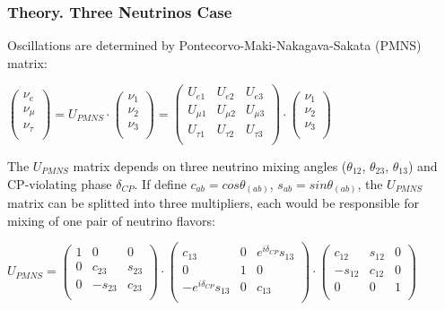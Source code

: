 \begin{frame}\frametitle{Theory. Three Neutrinos Case}
  \scriptsize
  Oscillations are determined by Pontecorvo-Maki-Nakagava-Sakata (PMNS) matrix:\\
  \begin{center}
  $ \begin{pmatrix} \nu_{e} \\ \nu_{\mu} \\ \nu_{\tau} \\ \end{pmatrix}
  = U_{PMNS}\cdot \begin{pmatrix} \nu_{1} \\ \nu_{2} \\ \nu_{3} \\ \end{pmatrix} = 
  \begin{pmatrix}
  U_{e1} & U_{e2} & U_{e3} \\
  U_{\mu1} & U_{\mu2} & U_{\mu3} \\
  U_{\tau1} & U_{\tau2} & U_{\tau3} \\
  \end{pmatrix}
  \cdot
  \begin{pmatrix} \nu_{1} \\ \nu_{2} \\ \nu_{3} \\ \end{pmatrix}$\\
  \end{center}
  The $U_{PMNS}$ matrix depends on three neutrino mixing angles ($\theta_{12}$, $\theta_{23}$, $\theta_{13}$) and CP-violating phase $\delta_{CP}$. If define $c_{ab}=cos\theta_(ab)$, $s_{ab}=sin\theta_(ab)$, the $U_{PMNS}$ matrix can be splitted into three multipliers, each would be responsible for mixing of one pair of neutrino flavors:\\
  \begin{center}
  $U_{PMNS} =
  \begin{pmatrix}
  1 & 0 & 0 \\
  0 & c_{23} & s_{23} \\
  0 & -s_{23} & c_{23} \\
  \end{pmatrix}
  \cdot
  \begin{pmatrix}
  c_{13} & 0 & e^{i\delta_{CP}}s_{13} \\
  0 & 1 & 0 \\
  -e^{i\delta_{CP}}s_{13} & 0 & c_{13} \\
  \end{pmatrix}
  \cdot
  \begin{pmatrix}
  c_{12} & s_{12} & 0 \\
  -s_{12} & c_{12} & 0 \\
  0 & 0 & 1 \\
  \end{pmatrix}$ \\
  \end{center}
\end{frame} 


